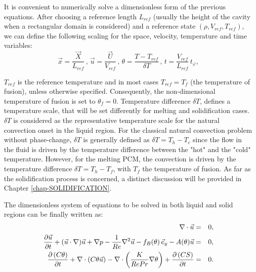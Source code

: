 It is convenient to numerically solve a dimensionless form of the previous equations.
After choosing a reference length $L_{ref}$ (usually the height of the cavity when a rectangular domain is considered) and a reference state $(\rho, V_{ref}, T_{ref})$, we can define the following scaling for the space, velocity, temperature and time variables:
\begin{equation}\label{eq-adim}
\vec{x} = \frac{\vec{X}}{L_{ref}} \, , \,  \vec{u} = \frac{\vec{U}}{V_{ref}} \, , \,  \theta = \frac{T-T_{ref}}{\delta T} \, , \,  t = \frac{V_{ref}}{L_{ref}} \, t_{\varphi},
\end{equation}

\noindent $T_{ref}$ is the reference temperature and in most cases $T_{ref} = T_f$ (the temperature of fusion), unless otherwise specified.
Consequently, the non-dimensional temperature of fusion is set to $\theta_f = 0$.
Temperature difference  $\delta T$, defines a temperature scale, that will be set differently for melting and solidification cases.
$\delta T$ is considered as the representative temperature scale  for the natural convection onset in the liquid region. 
For the classical natural convection problem without phase-change, $\delta T$ is generally defined as $\delta T=T_{h}-T_{c}$ since the flow in the fluid is driven by the temperature difference between the "hot" and the "cold" temperature.
However, for the melting PCM, the convection is driven by the temperature difference $\delta T=T_{h}-T_{f}$, with $T_f$ the temperature of fusion.
As far as the solidification process is concerned, a distinct discussion will be provided in Chapter \ref{chap-SOLIDIFICATION}. 

The dimensionless system of equations to be solved in both liquid and solid regions can be finally written as:
\begin{eqnarray}
\nabla\cdot \vec{u}&=&0, \label{eq-qmvt} \\ \vspace{0.2cm}
 \frac{\partial \vec{u}}{\partial t} + {(\vec{u}\cdot\nabla) \vec{u}} +\nabla p -\frac{1}{Re}{\nabla^2 \vec{u}} 
 - f_B(\theta)\, \vec{e}_y - A(\theta) \vec{u}&=&0, \label{eq-qmvt-2} \\ \vspace{0.2cm}
 \frac{\partial \left(C \theta\right)}{\partial t} + \nabla \cdot\left( C \theta \vec{u}\right) -
 \nabla \cdot\left( \frac{K}{Re Pr} \nabla \theta \right) +  \frac{\partial \left(C S\right)}{\partial t}  &=& 0. \label{eq-energ} 
\end{eqnarray}


